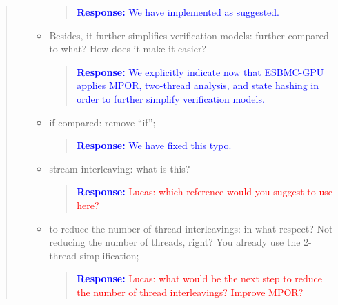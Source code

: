 \documentclass[11pt]{article}
\begin{document}
\begin{quote}
\begin{itemize}
\begin{itemize}
    \begin{quote}
    \textcolor{blue}{\textbf{Response:} We have implemented as suggested.}
    \end{quote}

  \item Besides, it further simplifies verification models: further compared to what? How does it make it easier?
  
    \begin{quote}
    \textcolor{blue}{\textbf{Response:} We explicitly indicate now that ESBMC-GPU applies MPOR, two-thread analysis, and state hashing in order to further simplify verification models.}
    \end{quote}

  \item if compared: remove ``if'';
  
    \begin{quote}
    \textcolor{blue}{\textbf{Response:} We have fixed this typo.}
    \end{quote}

  \item stream interleaving: what is this?
  
    \begin{quote}
    \textcolor{blue}{\textbf{Response:} \textcolor{red}{Lucas: which reference would you suggest to use here?}}
    \end{quote}

  \item  to reduce the number of thread interleavings: in what respect? Not reducing the number of threads, right? You already use the 2-thread simplification;
  
    \begin{quote}
    \textcolor{blue}{\textbf{Response:} \textcolor{red}{Lucas: what would be the next step to reduce the number of thread interleavings? Improve MPOR?}}
    \end{quote}

  \end{itemize}
\end{itemize}

\end{quote}

\label{LastPage}

\end{document}
